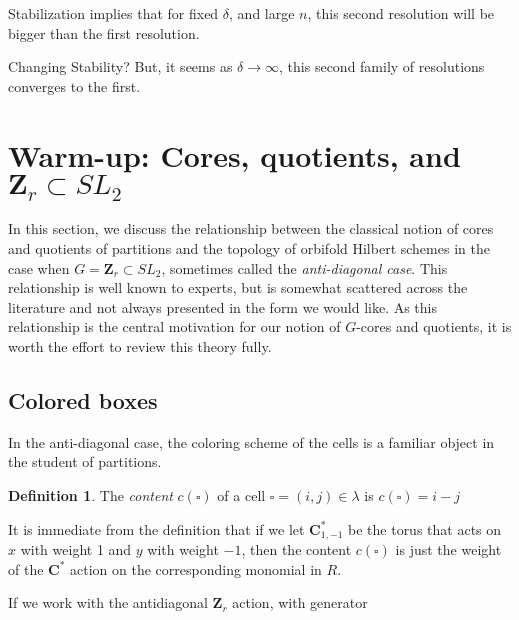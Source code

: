 \documentclass{amsart}[12pt]
\theoremstyle{definition}
\newtheorem{definition}[dummy]{Definition}
\newcommand{\Z}{\mathbf{Z}}
\newcommand{\C}{\mathbf{C}}
\begin{document}
Stabilization implies that for fixed $\delta$, and large $n$, this second resolution will be bigger than the first resolution.

Changing Stability?
But, it seems as $\delta\to\infty$, this second family of resolutions converges to the first.


\section{Warm-up: Cores, quotients, and $\Z_r\subset SL_2$}

In this section, we discuss the relationship between the classical notion of cores and quotients of partitions and the topology of orbifold Hilbert schemes in the case when $G=\Z_r\subset SL_2$, sometimes called the \emph{anti-diagonal case}.  This relationship is well known to experts, but is somewhat scattered across the literature and not always presented in the form we would like.  As this relationship is the central motivation for our notion of $G$-cores and quotients, it is worth the effort to review this theory fully.

\subsection{Colored boxes}

In the anti-diagonal case, the coloring scheme of the cells is a familiar object in the student of partitions.

\begin{definition}
The \emph{content} $c(\square)$ of a cell $\square=(i,j)\in\lambda$ is $c(\square)=i-j$
\end{definition}


It is immediate from the definition that if we let $\C^*_{1,-1}$ be the torus that acts on $x$ with weight 1 and $y$ with weight $-1$, then the content $c(\square)$ is just the weight of the $\C^*$ action on the corresponding monomial in $R$.

If we work with the antidiagonal $\Z_r$ action, with generator 
\end{document}
